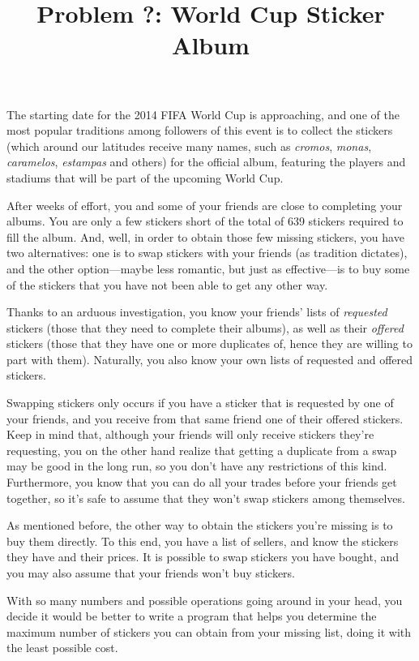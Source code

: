 \documentclass[12pt]{article}
\title{ Problem ?: World Cup Sticker Album }
\begin{document}
\maketitle

The starting date for the 2014 FIFA World Cup is approaching, and one of
the most popular traditions among followers of this event is to collect
the stickers (which around our latitudes receive many names, such as
\emph{cromos}, \emph{monas}, \emph{caramelos}, \emph{estampas} and
others) for the official album, featuring the players and stadiums that
will be part of the upcoming World Cup.

After weeks of effort, you and some of your friends are close to
completing your albums. You are only a few stickers short of the total
of 639 stickers required to fill the album. And, well, in order to
obtain those few missing stickers, you have two alternatives: one is to
swap stickers with your friends (as tradition dictates), and the other
option---maybe less romantic, but just as effective---is to buy some of
the stickers that you have not been able to get any other way.

Thanks to an arduous investigation, you know your friends' lists of
\emph{requested} stickers (those that they need to complete their
albums), as well as their \emph{offered} stickers (those that they have
one or more duplicates of, hence they are willing to part with them).
Naturally, you also know your own lists of requested and offered
stickers.

Swapping stickers only occurs if you have a sticker that is requested by
one of your friends, and you receive from that same friend one of their
offered stickers. Keep in mind that, although your friends will only
receive stickers they're requesting, you on the other hand realize that
getting a duplicate from a swap may be good in the long run, so you
don't have any restrictions of this kind. Furthermore, you know that you
can do all your trades before your friends get together, so it's safe to
assume that they won't swap stickers among themselves.

As mentioned before, the other way to obtain the stickers you're missing
is to buy them directly. To this end, you have a list of sellers, and
know the stickers they have and their prices. It is possible to swap
stickers you have bought, and you may also assume that your friends
won't buy stickers.

With so many numbers and possible operations going around in your head,
you decide it would be better to write a program that helps you
determine the maximum number of stickers you can obtain from your
missing list, doing it with the least possible cost.
\end{document}
